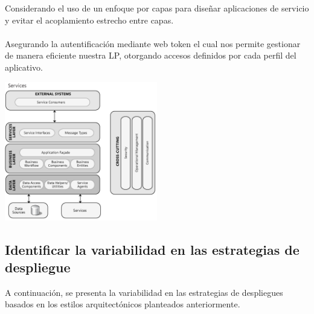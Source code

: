 \documentclass[10pt,a4paper,openany]{book}
\begin{document}
\begin{enumerate}
\begin{itemize}
	Considerando el uso de un enfoque por capas para diseñar aplicaciones de servicio y evitar el acoplamiento estrecho entre capas.\\\\
	Asegurando la autentificación mediante web token el cual nos permite gestionar de manera eficiente nuestra LP, otorgando accesos definidos por cada perfil del aplicativo.
\end{itemize}
\begin{center}
\includegraphics[width=0.5\textwidth]{arq2}
\end{center}
\end{enumerate}



\subsection{Identificar la variabilidad en las estrategias de despliegue}

A continuación, se presenta la variabilidad en las estrategias de despliegues basados en los estilos arquitectónicos planteados anteriormente. 
\end{document}
